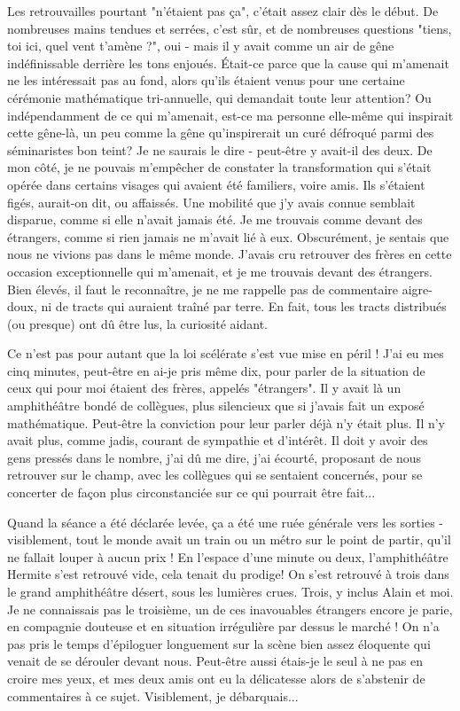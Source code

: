 Les retrouvailles pourtant "n'étaient pas ça", c'était assez clair dès le début. De nombreuses mains tendues et serrées, c'est sûr, et de nombreuses questions "tiens, toi ici, quel vent t'amène ?", oui - mais il y avait comme un air de gêne indéfinissable derrière les tons enjoués. Était-ce parce que la cause qui m'amenait ne les intéressait pas au fond, alors qu'ils étaient venus pour une certaine cérémonie mathématique tri-annuelle, qui demandait toute leur attention? Ou indépendamment de ce qui m'amenait, est-ce ma personne elle-même qui inspirait cette gêne-là, un peu comme la gêne qu'inspirerait un curé défroqué parmi des séminaristes bon teint? Je ne saurais le dire - peut-être y avait-il des deux. De mon côté, je ne pouvais m'empêcher de constater la transformation qui s'était opérée dans certains visages qui avaient été familiers, voire amis. Ils s'étaient figés, aurait-on dit, ou affaissés. Une mobilité que j'y avais connue semblait disparue, comme si elle n'avait jamais été. Je me trouvais comme devant des étrangers, comme si rien jamais ne m'avait lié à eux. Obscurément, je sentais que nous ne vivions pas dans le même monde. J'avais cru retrouver des frères en cette occasion exceptionnelle qui m'amenait, et je me trouvais devant des étrangers. Bien élevés, il faut le reconnaître, je ne me rappelle pas de commentaire aigre-doux, ni de tracts qui auraient traîné par terre. En fait, tous les tracts distribués (ou presque) ont dû être lus, la curiosité aidant.

Ce n'est pas pour autant que la loi scélérate s'est vue mise en péril ! J'ai eu mes cinq minutes, peut-être en ai-je pris même dix, pour parler de la situation de ceux qui pour moi étaient des frères, appelés "étrangers". Il y avait là un amphithéâtre bondé de collègues, plus silencieux que si j'avais fait un exposé mathématique. Peut-être la conviction pour leur parler déjà n'y était plus. Il n'y avait plus, comme jadis, courant de sympathie et d'intérêt. Il doit y avoir des gens pressés dans le nombre, j'ai dû me dire, j'ai écourté, proposant de nous retrouver sur le champ, avec les collègues qui se sentaient concernés, pour se concerter de façon plus circonstanciée sur ce qui pourrait être fait...

Quand la séance a été déclarée levée, ça a été une ruée générale vers les sorties - visiblement, tout le monde avait un train ou un métro sur le point de partir, qu'il ne fallait louper à aucun prix ! En l'espace d'une minute ou deux, l'amphithéâtre Hermite s'est retrouvé vide, cela tenait du prodige! On s'est retrouvé à trois dans le grand amphithéâtre désert, sous les lumières crues. Trois, y inclus Alain et moi. Je ne connaissais pas le troisième, un de ces inavouables étrangers encore je parie, en compagnie douteuse et en situation irrégulière par dessus le marché ! On n'a pas pris le temps d'épiloguer longuement sur la scène bien assez éloquente qui venait de se dérouler devant nous. Peut-être aussi étais-je le seul à ne pas en croire mes yeux, et mes deux amis ont eu la délicatesse alors de s'abstenir de commentaires à ce sujet. Visiblement, je débarquais...

